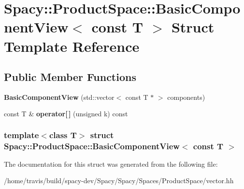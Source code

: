\hypertarget{structSpacy_1_1ProductSpace_1_1BasicComponentView_3_01const_01T_01_4}{\section{\-Spacy\-:\-:\-Product\-Space\-:\-:\-Basic\-Component\-View$<$ const \-T $>$ \-Struct \-Template \-Reference}
\label{structSpacy_1_1ProductSpace_1_1BasicComponentView_3_01const_01T_01_4}
}
\subsection*{\-Public \-Member \-Functions}
\begin{DoxyCompactItemize}
\item 
\hypertarget{structSpacy_1_1ProductSpace_1_1BasicComponentView_3_01const_01T_01_4_a52bd2d3c9fd74bd33998586a0e18899b}{{\bfseries \-Basic\-Component\-View} (std\-::vector$<$ const \-T $\ast$ $>$ components)}\label{structSpacy_1_1ProductSpace_1_1BasicComponentView_3_01const_01T_01_4_a52bd2d3c9fd74bd33998586a0e18899b}

\item 
\hypertarget{structSpacy_1_1ProductSpace_1_1BasicComponentView_3_01const_01T_01_4_a1b6db224f3a762bae833aadc0898cda5}{const \-T \& {\bfseries operator\mbox{[}$\,$\mbox{]}} (unsigned k) const }\label{structSpacy_1_1ProductSpace_1_1BasicComponentView_3_01const_01T_01_4_a1b6db224f3a762bae833aadc0898cda5}

\end{DoxyCompactItemize}
\subsubsection*{template$<$class T$>$ struct Spacy\-::\-Product\-Space\-::\-Basic\-Component\-View$<$ const T $>$}



\-The documentation for this struct was generated from the following file\-:\begin{DoxyCompactItemize}
\item 
/home/travis/build/spacy-\/dev/\-Spacy/\-Spacy/\-Spaces/\-Product\-Space/vector.\-hh\end{DoxyCompactItemize}
